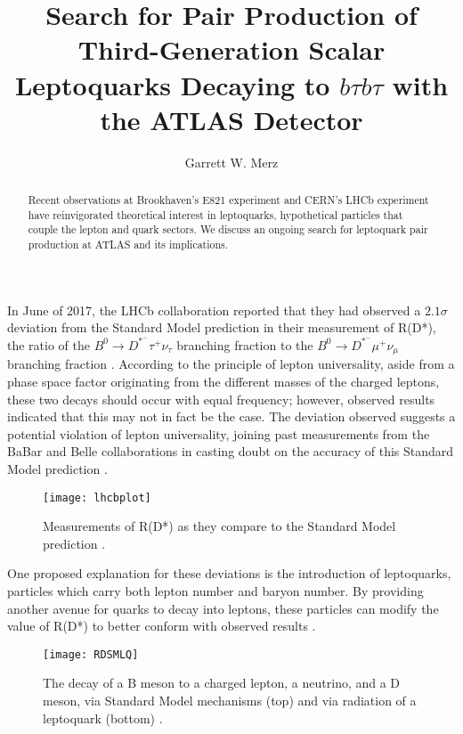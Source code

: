 \documentclass[
aps,
prl,
reprint,
showpacs,
]{revtex4-1}
\begin{document}
\title{Search for Pair Production of Third-Generation Scalar Leptoquarks Decaying to $b \tau b \tau $ with the ATLAS Detector}

\author{Garrett W. Merz}

\begin{abstract}
\noindent Recent observations at Brookhaven's E821 experiment and CERN's LHCb experiment have reinvigorated theoretical interest in leptoquarks, hypothetical particles that couple the lepton and quark sectors. We discuss an ongoing search for leptoquark pair production at ATLAS and its implications.
\end{abstract}


\maketitle

In June of 2017, the LHCb collaboration reported that they had observed a $2.1\sigma$ deviation from the Standard Model prediction in their measurement of R(D*), the ratio of the $B^0\rightarrow D^*^- \tau^+ \nu_\tau$ branching fraction to the $B^0\rightarrow D^*^- \mu^+ \nu_\mu$ branching fraction \cite{LHCbRD*}. According to the principle of lepton universality, aside from a phase space factor originating from the different masses of the charged leptons, these two decays should occur with equal frequency; however, observed results indicated that this may not in fact be the case. The deviation observed suggests a potential violation of lepton universality, joining past measurements from the BaBar and Belle collaborations in casting doubt on the accuracy of this Standard Model prediction \cite{BaBar, Belle}.


\begin{figure}[h]
\texttt{[image: lhcbplot]} 
\caption{Measurements of R(D*) as they compare to the Standard Model prediction \cite{LHCbRD*}.}
\label{fig:landscape}
\end{figure}


One proposed explanation for these deviations is the introduction of leptoquarks, particles which carry both lepton number and baryon number. By providing another avenue for quarks to decay into leptons, these particles can modify the value of R(D*) to better conform with observed results \cite{Ciezarek}.
\begin{figure}[h]
\texttt{[image: RDSMLQ]} 
\caption{The decay of a B meson to a charged lepton, a neutrino, and a D meson, via Standard Model mechanisms (top) and via radiation of a leptoquark (bottom) \cite{Ciezarek}.}
\label{fig:landscape}
\end{figure}
\end{document}
